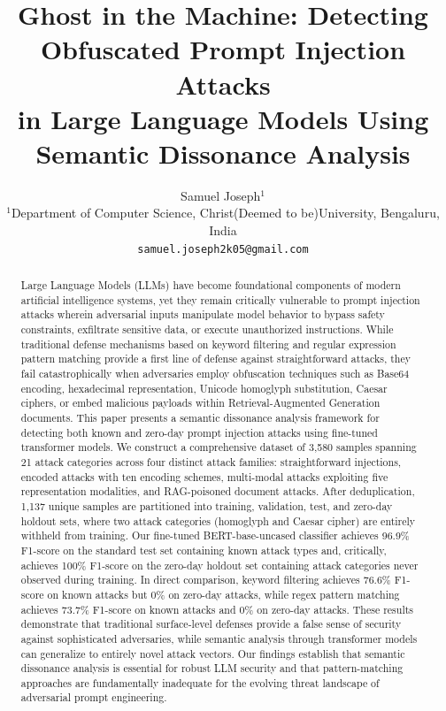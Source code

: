 \documentclass[11pt]{article}
\title{Ghost in the Machine: Detecting Obfuscated Prompt Injection Attacks\\
in Large Language Models Using Semantic Dissonance Analysis}
\author{
  Samuel Joseph$^{1}$ \\[6pt]
  $^{1}$Department of Computer Science, Christ(Deemed to be)University, Bengaluru, India \\[3pt]
  \texttt{samuel.joseph2k05@gmail.com}
}
\date{} %
\begin{document}
\maketitle

\begin{abstract}
Large Language Models (LLMs) have become foundational components of modern artificial intelligence systems, yet they remain critically vulnerable to prompt injection attacks wherein adversarial inputs manipulate model behavior to bypass safety constraints, exfiltrate sensitive data, or execute unauthorized instructions. While traditional defense mechanisms based on keyword filtering and regular expression pattern matching provide a first line of defense against straightforward attacks, they fail catastrophically when adversaries employ obfuscation techniques such as Base64 encoding, hexadecimal representation, Unicode homoglyph substitution, Caesar ciphers, or embed malicious payloads within Retrieval-Augmented Generation documents. This paper presents a semantic dissonance analysis framework for detecting both known and zero-day prompt injection attacks using fine-tuned transformer models. We construct a comprehensive dataset of 3,580 samples spanning 21 attack categories across four distinct attack families: straightforward injections, encoded attacks with ten encoding schemes, multi-modal attacks exploiting five representation modalities, and RAG-poisoned document attacks. After deduplication, 1,137 unique samples are partitioned into training, validation, test, and zero-day holdout sets, where two attack categories (homoglyph and Caesar cipher) are entirely withheld from training. Our fine-tuned BERT-base-uncased classifier achieves 96.9\% F1-score on the standard test set containing known attack types and, critically, achieves 100\% F1-score on the zero-day holdout set containing attack categories never observed during training. In direct comparison, keyword filtering achieves 76.6\% F1-score on known attacks but 0\% on zero-day attacks, while regex pattern matching achieves 73.7\% F1-score on known attacks and 0\% on zero-day attacks. These results demonstrate that traditional surface-level defenses provide a false sense of security against sophisticated adversaries, while semantic analysis through transformer models can generalize to entirely novel attack vectors. Our findings establish that semantic dissonance analysis is essential for robust LLM security and that pattern-matching approaches are fundamentally inadequate for the evolving threat landscape of adversarial prompt engineering.
\end{abstract}
\end{document}
